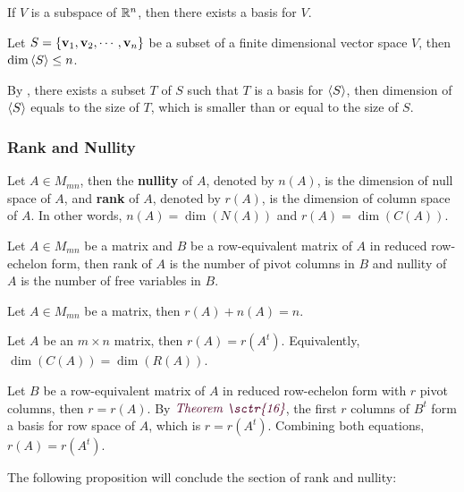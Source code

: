\documentclass[a4paper,12pt]{article}
\begin{document}
\begin{thm}
  If $V$ is a subspace of $\mathbb{R}^{n}$, then there exists a basis for $V$.
\end{thm}\n

\begin{pst}
  Let $S=\left\{ \mathbf{v}_{1},\mathbf{v}_{2},\cdots,\mathbf{v}_{n}\right\}$ be a subset of a finite dimensional vector space $V$, then $\dim\left\langle S\right\rangle\leq n$.\n

  \prf By \rthm[\sctr{7}], there exists a subset $T$ of $S$ such that $T$ is a basis for $\left\langle S\right\rangle$, then dimension of $\left\langle S\right\rangle$ equals to the size of $T$, which is smaller than or equal to the size of $S$.
\end{pst}\n

\subsubsection{Rank and Nullity}
\begin{dft}
  Let $A\in M_{mn}$, then the \textbf{nullity} of $A$, denoted by $n(A)$, is the dimension of null space of $A$, and \textbf{rank} of $A$, denoted by $r(A)$, is the dimension of column space of $A$. In other words, $n(A)=\dim(N(A))$ and $r(A)=\dim(C(A))$.
\end{dft}\n

\begin{thm}
  Let $A\in M_{mn}$ be a matrix and $B$ be a row-equivalent matrix of $A$ in reduced row-echelon form, then rank of $A$ is the number of pivot columns in $B$ and nullity of $A$ is the number of free variables in $B$.
\end{thm}\n

\begin{crl}
  Let $A\in M_{mn}$ be a matrix, then $r(A)+n(A)=n$.
\end{crl}\n

\begin{thm}
  Let $A$ be an $m\times n$ matrix, then $r(A)=r(A^{t})$. Equivalently, $\dim(C(A))=\dim(R(A))$.\n

  \prf Let $B$ be a row-equivalent matrix of $A$ in reduced row-echelon form with $r$ pivot columns, then $r=r(A)$. By $\rthm[\sctr{16}]$, the first $r$ columns of $B^{t}$ form a basis for row space of $A$, which is $r=r(A^{t})$. Combining both equations, $r(A)=r(A^{t})$.
\end{thm}\n

The following proposition will conclude the section of rank and nullity:\n
\end{document}
